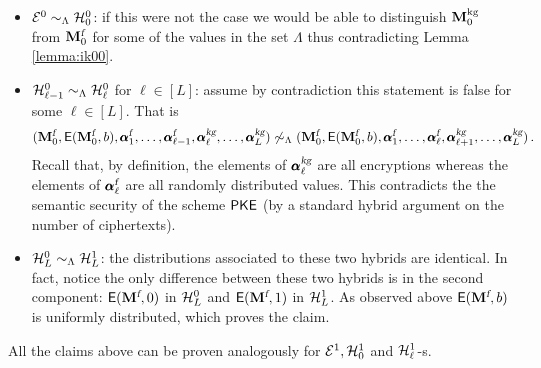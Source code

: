 \begin{itemize}
\item $\mathcal{E}^{0} \sim_{\Lambda} \mathcal{H}^{0}_0$: if this were not the case we would be able to distinguish $\mathbf{M}^{\text{kg}}_0$ from $\mathbf{M}^{\mathcal{{\textsl{f}}}}_0$ for some of the values in the set $\Lambda$ thus contradicting Lemma \ref{lemma:ik00}.
\item $\mathcal{H}^{0}_{\ell-1} \sim_{\Lambda} \mathcal{H}^{0}_{\ell}$ for $\ell \in [L]$: assume by contradiction this statement is false for some $\ell \in [L]$. That is 
\[
(\mathbf{M}^{\mathcal{{\textsl{f}}}}_0, \mathsf{E}(\mathbf{M}^{\mathcal{{\textsl{f}}}}_0, b), \pmb{\alpha}^{{\textsl{f}}}_1, \dots, \pmb{\alpha}^{{\textsl{f}}}_{\ell-1}, \pmb{\alpha}^{{\textsl{kg}}}_{\ell}, \dots, \pmb{\alpha}^{{\textsl{kg}}}_L) \not \sim_{\Lambda} 
(\mathbf{M}^{\mathcal{{\textsl{f}}}}_0, \mathsf{E}(\mathbf{M}^{\mathcal{{\textsl{f}}}}_0, b), \pmb{\alpha}^{{\textsl{f}}}_1, \dots, \pmb{\alpha}^{{\textsl{f}}}_{\ell}, \pmb{\alpha}^{{\textsl{kg}}}_{\ell+1}, \dots, \pmb{\alpha}^{{\textsl{kg}}}_L) \, .
\]
Recall that, by definition, the elements of $\pmb{\alpha}^{{\textsl{kg}}}_{\ell}$ are all encryptions whereas the elements of $\pmb{\alpha}^{{\textsl{f}}}_{\ell}$ are all randomly distributed values. This contradicts the the semantic security of the scheme $\mathsf{PKE}$ (by a standard hybrid argument on the number of ciphertexts). 


\item $\mathcal{H}^{0}_{L} \sim_{\Lambda} \mathcal{H}^1_{L}$: the distributions associated to these two hybrids are identical. In fact, notice the only difference between these two hybrids is in the second component: $\mathsf{E}(\mathbf{M}^{\mathcal{{\textsl{f}}}}, 0)$ in $\mathcal{H}^{0}_{L}$ and $\mathsf{E}(\mathbf{M}^{\mathcal{{\textsl{f}}}}, 1)$ in $\mathcal{H}^1_{L}$. As observed above $\mathsf{E}(\mathbf{M}^{\mathcal{{\textsl{f}}}}, b)$ is uniformly distributed, which proves the claim.
\end{itemize}

All the claims above can be proven analogously for  $\mathcal{E}^1, \mathcal{H}^1_{0}$  and $\mathcal{H}^1_{\ell}$-s.
